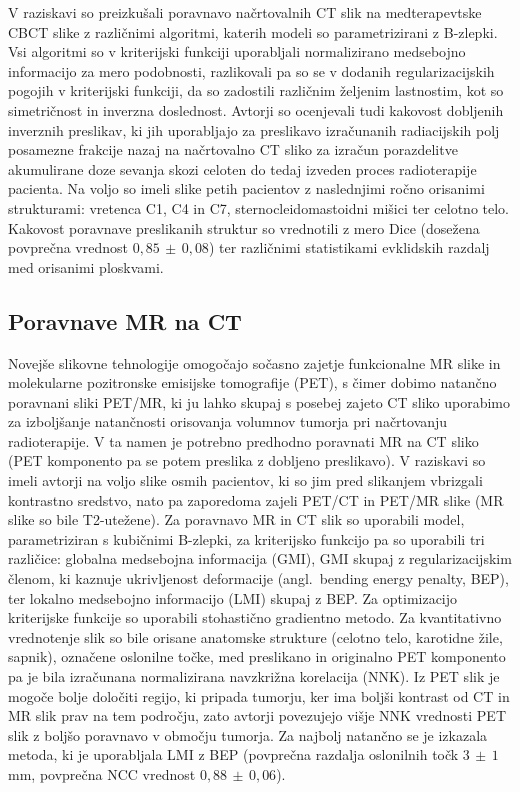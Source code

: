 \documentclass[journal]{IEEEtran}
\begin{document}
V raziskavi \cite{veiga2015} so preizkušali poravnavo načrtovalnih CT slik na medterapevtske CBCT slike z različnimi algoritmi, katerih modeli so parametrizirani z B-zlepki. Vsi algoritmi so v kriterijski funkciji uporabljali normalizirano medsebojno informacijo za mero podobnosti, razlikovali pa so se v dodanih regularizacijskih pogojih v kriterijski funkciji, da so zadostili različnim željenim lastnostim, kot so simetričnost in inverzna doslednost. Avtorji so ocenjevali tudi kakovost dobljenih inverznih preslikav, ki jih uporabljajo za preslikavo izračunanih radiacijskih polj posamezne frakcije nazaj na načrtovalno CT sliko za izračun porazdelitve akumulirane doze sevanja skozi celoten do tedaj izveden proces radioterapije pacienta. Na voljo so imeli slike petih pacientov z naslednjimi ročno orisanimi strukturami: vretenca C1, C4 in C7, sternocleidomastoidni mišici ter celotno telo. Kakovost poravnave preslikanih struktur so vrednotili z mero Dice (dosežena povprečna vrednost $0{,}85\,\pm\,0{,}08$) ter različnimi statistikami evklidskih razdalj med orisanimi ploskvami.

\subsection{Poravnave MR na CT}

Novejše slikovne tehnologije omogočajo sočasno zajetje funkcionalne MR slike in molekularne pozitronske emisijske tomografije (PET), s čimer dobimo natančno poravnani sliki PET/MR, ki ju lahko skupaj s posebej zajeto CT sliko uporabimo za izboljšanje natančnosti orisovanja volumnov tumorja pri načrtovanju radioterapije. V ta namen je potrebno predhodno poravnati MR na CT sliko (PET komponento pa se potem preslika z dobljeno preslikavo). V raziskavi \cite{leibfarth2013} so imeli avtorji na voljo slike osmih pacientov, ki so jim pred slikanjem vbrizgali kontrastno sredstvo, nato pa zaporedoma zajeli PET/CT in PET/MR slike (MR slike so bile T2-utežene). Za poravnavo MR in CT slik so uporabili model, parametriziran s kubičnimi B-zlepki, za kriterijsko funkcijo pa so uporabili tri različice: globalna medsebojna informacija (GMI), GMI skupaj z regularizacijskim členom, ki kaznuje ukrivljenost deformacije (angl.~bending energy penalty, BEP), ter lokalno medsebojno informacijo (LMI) skupaj z BEP. Za optimizacijo kriterijske funkcije so uporabili stohastično gradientno metodo. Za kvantitativno vrednotenje slik so bile orisane anatomske strukture (celotno telo, karotidne žile, sapnik), označene oslonilne točke, med preslikano in originalno PET komponento pa je bila izračunana normalizirana navzkrižna korelacija (NNK). Iz PET slik je mogoče bolje določiti regijo, ki pripada tumorju, ker ima boljši kontrast od CT in MR slik prav na tem področju, zato avtorji povezujejo višje NNK vrednosti PET slik z boljšo poravnavo v območju tumorja. Za najbolj natančno se je izkazala metoda, ki je uporabljala LMI z BEP (povprečna razdalja oslonilnih točk $3\,\pm\,1$ mm, povprečna NCC vrednost $0{,}88\,\pm\,0{,}06$).
\end{document}
